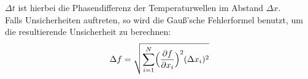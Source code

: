 \(\Delta t\) ist hierbei die Phasendifferenz der Temperaturwellen im Abstand \(\Delta x\).
\\
Falls Unsicherheiten auftreten, so wird die Gauß'sche Fehlerformel benutzt, um die resultierende Unsicherheit zu berechnen:
\begin{equation}
    \Delta f = \sqrt{\sum_{i=1}^N  \Bigl(\frac{\partial f}{\partial x_i}\Bigr)^2 (\Delta x_i)^2}
    \label{eq:gauß}
\end{equation}